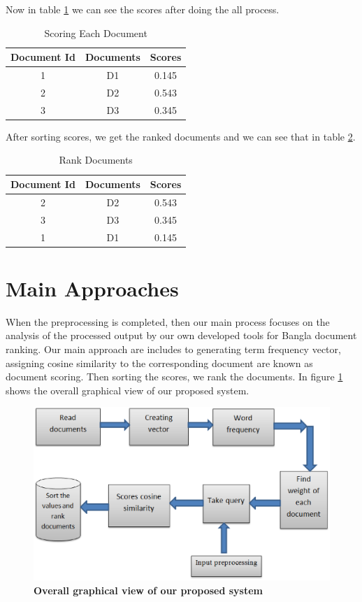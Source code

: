 Now in table \ref{tab:Scoring} we can see the scores after doing the all process.

\begin{table}[htp]	
\centering

\caption{Scoring Each Document  }
\vspace{0.5cm}
\begin{tabular}{|c|c|c|} 
\hline

	Document Id & Documents & Scores \\ \hline
 1 & D1 &	0.145   \\ \hline
 2 & D2 & 0.543   \\ \hline
 3 & D3  &0.345   \\ \hline


\end{tabular}
\label{tab:Scoring}
\end{table}

After sorting scores, we get the ranked documents and we can see that in table \ref{tab:Rank}.


\begin{table}[htp]	
\centering
\caption{Rank Documents  }
\vspace{0.5cm}
\begin{tabular}{|c|c|c|} 
\hline

Document Id & Documents & Scores \\ \hline
 2 & D2 &	0.543   \\ \hline
 3 & D3 & 0.345   \\ \hline
 1 & D1 &0.145  \\ \hline


\end{tabular}
\label{tab:Rank}
\end{table}


\section{Main Approaches}

When the preprocessing is completed, then our main process focuses on the analysis of the processed output by our own developed tools for Bangla document ranking. Our main approach are includes to generating term frequency vector, assigning cosine similarity to the corresponding document are known as document scoring. Then sorting the scores, we rank the documents. In figure \ref{Figure:graphical} shows the overall graphical view of our proposed system.

\begin{figure}[htp]
	\centering
		\includegraphics[width=.65\textwidth]{figure/five.eps}
	\caption{\textbf{Overall graphical view of our proposed system}}
	\label{Figure:graphical}
\end{figure}

